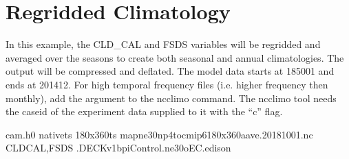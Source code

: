 \documentclass[letterpaper,10pt,english]{sphinxmanual}
\begin{document}
\section{Regridded Climatology}
\label{\detokenize{atm_regrid:regridded-climatology}}
In this example, the CLD\_CAL and FSDS variables will be regridded and averaged over the seasons to create both seasonal and annual climatologies.
The output will be compressed and deflated. The model data starts at 1850\sphinxhyphen{}01 and ends at 2014\sphinxhyphen{}12. For high temporal frequency files
(i.e. higher frequency then monthly), add the  argument to the ncclimo command. The ncclimo tool needs the caseid of the
experiment data supplied to it with the “\sphinxhyphen{}c” flag.

\begin{sphinxVerbatim}[commandchars=\\\{\}]

cam.h0
native\PYGZus{}ts                                    
180x360ts                                    
map\PYGZus{}ne30np4\PYGZus{}to\PYGZus{}cmip6\PYGZus{}180x360\PYGZus{}aave.20181001.nc   
CLD\PYGZus{}CAL,FSDS                                       
                                              
                                                
                                  
.DECKv1b\PYGZus{}piControl.ne30\PYGZus{}oEC.edison       


\end{sphinxVerbatim}
\end{document}
